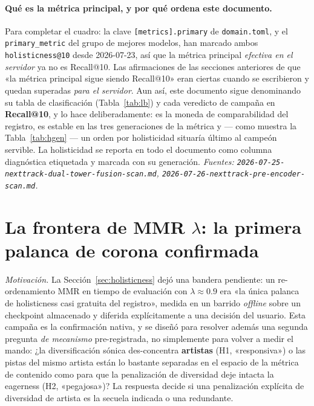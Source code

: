 \documentclass[11pt]{article}
\begin{document}
\paragraph{Qué es la métrica principal, y por qué ordena este documento.} Para
completar el cuadro: la clave \texttt{[metrics].primary} de \texttt{domain.toml},
y el \texttt{primary\_metric} del grupo de mejores modelos, han marcado ambos
\texttt{holisticness@10} desde 2026-07-23, así que la métrica principal
\emph{efectiva en el servidor} ya no es Recall@10. Las afirmaciones de las
secciones anteriores de que «la métrica principal sigue siendo Recall@10» eran
ciertas cuando se escribieron y quedan superadas \emph{para el servidor}. Aun
así, este documento sigue denominando su tabla de clasificación
(Tabla~\ref{tab:lb}) y cada veredicto de campaña en \textbf{Recall@10}, y lo hace
deliberadamente: es la moneda de comparabilidad del registro, es estable en las
tres generaciones de la métrica y --- como muestra la Tabla~\ref{tab:hgen} --- un
orden por holisticidad situaría último al campeón servible. La holisticidad se
reporta en todo el documento como columna diagnóstica etiquetada y marcada con su
generación.
\emph{Fuentes: \texttt{2026-07-25-nexttrack-dual-tower-fusion-scan.md},
\texttt{2026-07-26-nexttrack-pre-encoder-scan.md}.}

\section{La frontera de MMR $\lambda$: la primera palanca de corona confirmada}
\label{sec:mmr}
\emph{Motivación.} La Sección~\ref{sec:holisticness} dejó una bandera pendiente:
un re-ordenamiento MMR en tiempo de evaluación con $\lambda\approx\num{0.9}$ era
«la única palanca de holisticness casi gratuita del registro», medida en un barrido
\emph{offline} sobre un checkpoint almacenado y diferida explícitamente a una
decisión del usuario. Esta campaña es la confirmación nativa, y se diseñó para
resolver además una segunda pregunta \emph{de mecanismo} pre-registrada, no
simplemente para volver a medir el mando: ¿la diversificación sónica
des-concentra \textbf{artistas} (H1, «responsiva») o las pistas del mismo artista
están lo bastante separadas en el espacio de la métrica de contenido como para que
la penalización de diversidad deje intacta la eagerness (H2, «pegajosa»)? La
respuesta decide si una penalización explícita de diversidad de artista es la
secuela indicada o una redundante.
\end{document}

